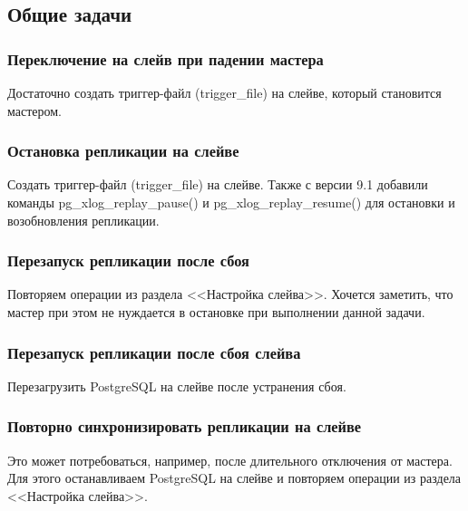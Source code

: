 \subsection{Общие задачи}
\subsubsection{Переключение на слейв при падении мастера}
Достаточно создать триггер-файл (trigger\_file) на слейве, который становится мастером.

\subsubsection{Остановка репликации на слейве}
Создать триггер-файл (trigger\_file) на слейве. Также с версии 9.1 добавили команды pg\_xlog\_replay\_pause() и pg\_xlog\_replay\_resume() для остановки и возобновления репликации.

\subsubsection{Перезапуск репликации после сбоя}
Повторяем операции из раздела <<Настройка слейва>>. Хочется заметить, что мастер при этом не нуждается в остановке при выполнении данной задачи.

\subsubsection{Перезапуск репликации после сбоя слейва}
Перезагрузить PostgreSQL на слейве после устранения сбоя.

\subsubsection{Повторно синхронизировать репликации на слейве}
Это может потребоваться, например, после длительного отключения от мастера. 
Для этого останавливаем PostgreSQL на слейве и повторяем операции из раздела <<Настройка слейва>>.